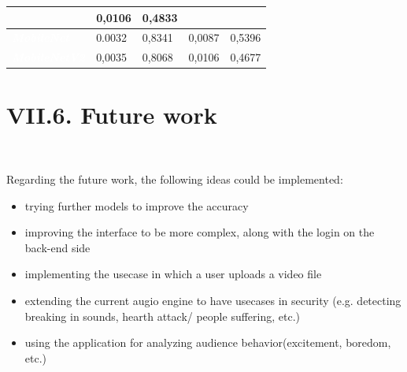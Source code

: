 \documentclass[11pt, a4papper]{report}
\theoremstyle{plain}
\theoremstyle{definition}
\theoremstyle{definition}
\theoremstyle{proposition}
\begin{document}
\begin{center}
\begin{footnotesize}
\begin{tabular}{ | M{4.6cm} | m{2cm} | m{2cm} |m{2cm} | m{2cm}}
&   {0,0106} 
&   {0,4833}  \\
\hline
{}
\textit{\textbf{\textcolor{white}{MobileNet}}}&   {0.0032} &   {0,8341} 
&   {0,0087} 
&   {0,5396}  \\
\hline
{}
\textit{\textbf{\textcolor{white}{MobileNetV2}}}&   {0,0035} &   {0,8068} 
&   {0,0106} 
&   {0,4677}  \\
\hline
\end{tabular}
\end{footnotesize}
\end{center}

\section*{VII.6. Future work}
\

Regarding the future work, the following ideas could be implemented:
\begin{itemize}
\item trying further models to improve the accuracy
\item improving the interface to be more complex, along with the login on the back-end side
\item implementing the usecase in which a user uploads a video file
\item extending the current augio engine to have usecases in security (e.g. detecting breaking in sounds, hearth attack/ people suffering, etc.)
\item using the application for analyzing audience behavior(excitement, boredom, etc.)
\end{itemize}

\end{document}
